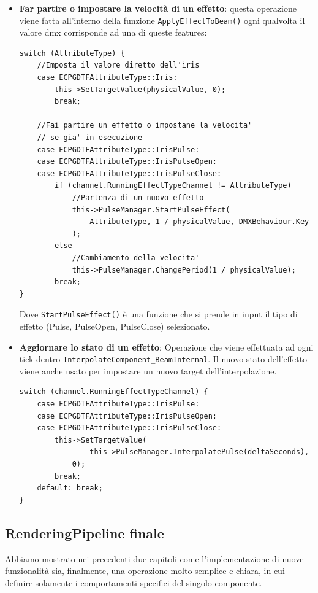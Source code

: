\documentclass[main.tex]{subfiles}
\begin{document}
\begin{itemize}
    \item \textbf{Far partire o impostare la velocità di un effetto}: questa operazione viene fatta all'interno della funzione \lstinline{ApplyEffectToBeam()} ogni qualvolta il valore dmx corrisponde ad una di queste features:
    \begin{lstlisting}
switch (AttributeType) {
    //Imposta il valore diretto dell'iris
	case ECPGDTFAttributeType::Iris:
		this->SetTargetValue(physicalValue, 0);
		break;

    //Fai partire un effetto o impostane la velocita'
    // se gia' in esecuzione
	case ECPGDTFAttributeType::IrisPulse:
	case ECPGDTFAttributeType::IrisPulseOpen:
	case ECPGDTFAttributeType::IrisPulseClose:
		if (channel.RunningEffectTypeChannel != AttributeType) 
            //Partenza di un nuovo effetto
            this->PulseManager.StartPulseEffect(
                AttributeType, 1 / physicalValue, DMXBehaviour.Key
            );
		else
            //Cambiamento della velocita'
            this->PulseManager.ChangePeriod(1 / physicalValue);
		break;
}
\end{lstlisting}
    Dove \lstinline{StartPulseEffect()} è una funzione che si prende in input il tipo di effetto (Pulse, PulseOpen, PulseClose) selezionato.
    \item \textbf{Aggiornare lo stato di un effetto}: Operazione che viene effettuata ad ogni tick dentro \lstinline{InterpolateComponent_BeamInternal}. Il nuovo stato dell'effetto viene anche usato per impostare un nuovo target dell'interpolazione.
    \begin{lstlisting}
switch (channel.RunningEffectTypeChannel) {
    case ECPGDTFAttributeType::IrisPulse:
    case ECPGDTFAttributeType::IrisPulseOpen:
    case ECPGDTFAttributeType::IrisPulseClose:
        this->SetTargetValue(
                this->PulseManager.InterpolatePulse(deltaSeconds),
            0);
        break;
    default: break;
}
\end{lstlisting}
\end{itemize}

\subsection{RenderingPipeline finale}\label{subsec:5_final}
Abbiamo mostrato nei precedenti due capitoli come l'implementazione di nuove funzionalità sia, finalmente, una operazione molto semplice e chiara, in cui definire solamente i comportamenti specifici del singolo componente.
\end{document}
